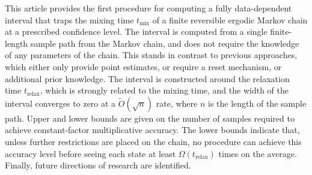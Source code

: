 This article provides the first procedure for computing a fully
data-dependent interval that traps the mixing time
$t_{\text{mix}}$ of a finite
reversible ergodic Markov chain at a prescribed confidence level.  The
interval is computed from a single finite-length sample path from the
Markov chain, and does not require the knowledge of any parameters of
the chain.  This stands in contrast to previous approaches, which
either only provide point estimates, or require a reset mechanism, or
additional prior knowledge.
The interval is constructed around the relaxation time
$t_{\text{relax}}$, which is strongly related to the mixing time, and
the width of the interval converges to zero
at a $\tilde{O}(\sqrt{n})$ rate, where $n$ is the length of the sample path.
Upper and lower bounds are given on the number of samples required to
achieve constant-factor multiplicative accuracy.  The lower bounds
indicate that, unless further restrictions are placed on the chain, no
procedure can achieve this accuracy level before seeing each state at
least $\Omega(t_{\text{relax}})$ times on the average.  Finally, future
directions of research are identified.

